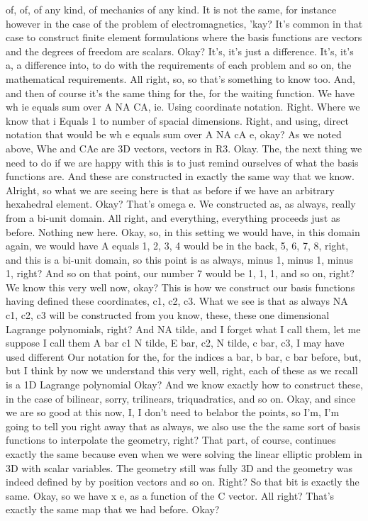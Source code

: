 \documentclass[10pt]{article}
\begin{document}
of, of, of any kind, of mechanics of any kind. It is not the same, for instance however in the case of the problem of electromagnetics, 'kay? It's common in that case to construct finite element formulations where the basis functions are vectors and the degrees of freedom are scalars. Okay? It's, it's just a difference. It's, it's a, a difference into, to do with the requirements of each problem and so on, the mathematical requirements. All right, so, so that's something to know too. And, and then of course it's the same thing for the, for the waiting function. We have wh ie equals sum over A NA CA, ie. Using coordinate notation. Right. Where we know that i Equals 1 to number of spacial dimensions. Right, and using, direct notation that would be wh e equals sum over A NA cA e, okay? As we noted above, Whe and CAe are 3D vectors, vectors in R3. Okay. The, the next thing we need to do if we are happy with this is to just remind ourselves of what the basis functions are. And these are constructed in exactly the same way that we know. Alright, so what we are seeing here is that as before if we have an arbitrary hexahedral element. Okay? That's omega e. We constructed as, as always, really from a bi-unit domain. All right, and everything, everything proceeds just as before. Nothing new here. Okay, so, in this setting we would have, in this domain again, we would have A equals 1, 2, 3, 4 would be in the back, 5, 6, 7, 8, right, and this is a bi-unit domain, so this point is as always, minus 1, minus 1, minus 1, right? And so on that point, our number 7 would be 1, 1, 1, and so on, right? We know this very well now, okay? This is how we construct our basis functions having defined these coordinates, c1, c2, c3. What we see is that as always NA c1, c2, c3 will be constructed from you know, these, these one dimensional Lagrange polynomials, right? And NA tilde, and I forget what I call them, let me suppose I call them A bar c1 N tilde, E bar, c2, N tilde, c bar, c3, I may have used different Our notation for the, for the indices a bar, b bar, c bar before, but, but I think by now we understand this very well, right, each of these as we recall is a 1D Lagrange polynomial Okay? And we know exactly how to construct these, in the case of bilinear, sorry, trilinears, triquadratics, and so on. Okay, and since we are so good at this now, I, I don't need to belabor the points, so I'm, I'm going to tell you right away that as always, we also use the the same sort of basis functions to interpolate the geometry, right? That part, of course, continues exactly the same because even when we were solving the linear elliptic problem in 3D with scalar variables. The geometry still was fully 3D and the geometry was indeed defined by by position vectors and so on. Right? So that bit is exactly the same. Okay, so we have x e, as a function of the C vector. All right? That's exactly the same map that we had before. Okay?
\end{document}
